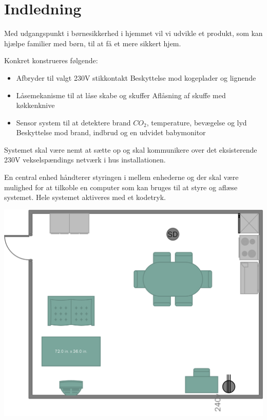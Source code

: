 \chapter{Indledning}

Med udgangspunkt i børnesikkerhed i hjemmet vil vi udvikle et produkt, som kan hjælpe familier med børn, til at få et mere sikkert hjem.

Konkret konstrueres følgende:

\begin{itemize}
\item Afbryder til valgt 230V stikkontakt
\subitem Beskyttelse mod kogeplader og lignende
\item Låsemekanisme til at låse skabe og skuffer
\subitem Aflåsning af skuffe med køkkenknive
\item Sensor system til at detektere brand $CO_2$, temperature, bevægelse og lyd
\subitem Beskyttelse mod brand, indbrud og en udvidet babymonitor
\end{itemize}

Systemet skal være nemt at sætte op og skal kommunikere over det eksisterende 230V vekselspændings netværk i hus installationen.

En central enhed håndterer styringen i mellem enhederne og der skal være mulighed for at tilkoble en computer som kan bruges til at styre og aflæse systemet. Hele systemet aktiveres med et kodetryk.

\includegraphics[width=\textwidth]{billeder/Plan_tegning}
